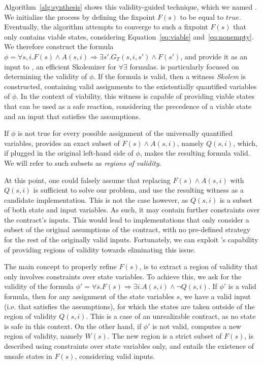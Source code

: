 Algorithm~\ref{alg:synthesis} shows this validity-guided technique, which we
named \jsynvg.
We initialize the process by defining the fixpoint $F(s)$ to be equal to $true$.
Eventually, the algorithm attempts to converge to such a fixpoint $F(s)$ that
only contains viable states, considering Equation~\ref{eq:viable}
and~\ref{eq:nonempty}.
We therefore construct the formula $\phi = \forall s,i. F(s) \land A(s,i)
\Rightarrow \exists s'.
			G_{T}(s,i,s') \land F(s')$, and provide it as an input to \aeval, an efficient
Skolemizer for $\forall\exists$ formulas. \aeval is particularly focused on
determining the validity of $\phi$. If the formula is valid, then a witness
\textit{Skolem} is constructed, containing valid assignments to the
existentially quantified variables of $\phi$. In the context of viability, this
witness is capable of providing viable states that can be used as a safe
reaction, considering the precedence of a viable state and an input that
satisfies the assumptions.

If $\phi$ is not true for every possible assignment of the universally
quantified variables, \aeval provides an exact subset of $F(s) \land A(s,i)$, namely
$Q(s,i)$, which, if plugged in the original left-hand side of $\phi$, makes the
resulting formula valid. We will refer to such subsets as \textit{regions of
validity}.

At this point, one could falsely assume that replacing $F(s) \land A(s,i)$ with
$Q(s,i)$ is sufficient to solve our problem, and use the resulting witness as a
candidate implementation. This is not the case however, as $Q(s,i)$ is a subset
of both state and input variables. As such, it may contain further constraints
over the contract's inputs. This would lead to implementations that only
consider a subset of the original assumptions of the contract, with no
pre-defined strategy for the rest of the originally valid inputs.
Fortunately, we can exploit \aeval's capability of providing regions of validity
towards eliminating this issue.

The main concept to properly refine $F(s)$, is to extract a region of validity
that only involves constraints over state variables. To achieve this, we ask for
the validity of the formula $\phi' = \forall s. F(s) \Rightarrow \exists
i. A(s,i) \land \lnot Q(s,i)$. If $\phi'$ is a valid formula, then for any
assignment of the state variables $s$, we have a valid input (i.e. that
satisfies the assumptions), for which the states are taken outside of the region
of validity $Q(s,i)$. This is a case of an unrealizable contract, as no state is
safe in this context. On the other hand, if $\phi'$ is not valid, \aeval computes
a new region of validity, namely $W(s)$. The new region is a strict subset of
$F(s)$, is described using constraints over state variables only, and entails
the existence of unsafe states in $F(s)$, considering valid inputs.

